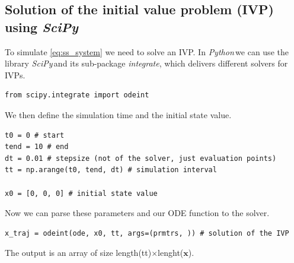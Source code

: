\documentclass[a4paper,11pt,headings=standardclasses]{scrartcl}%
\newcommand{\py}{\emph{Python}\,}
\newcommand{\scipy}{\emph{SciPy}\,}
\begin{document}
\subsection{Solution of the initial value problem (IVP) using \scipy}
To simulate \eqref{eq:ss_system} we need to solve an IVP. In \py we can use the library \scipy and its sub-package \emph{integrate}, which delivers different solvers for IVPs.
\begin{lstlisting}
from scipy.integrate import odeint
\end{lstlisting}
We then define the simulation time and the initial state value.
\begin{lstlisting}
t0 = 0 # start 
tend = 10 # end
dt = 0.01 # stepsize (not of the solver, just evaluation points)
tt = np.arange(t0, tend, dt) # simulation interval

x0 = [0, 0, 0] # initial state value
\end{lstlisting}
Now we can parse these parameters and our ODE function to the solver.
\begin{lstlisting}
x_traj = odeint(ode, x0, tt, args=(prmtrs, )) # solution of the IVP
\end{lstlisting}
The output is an array of size length(tt)$\times$lenght($\mathbf{x}$).
\end{document}
